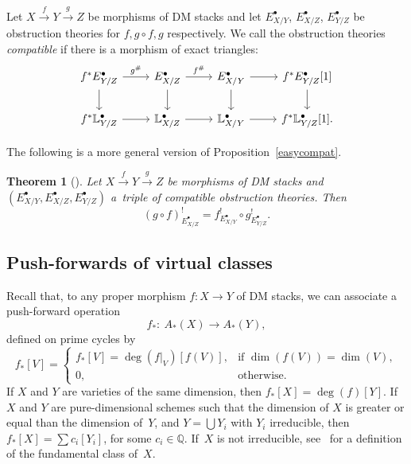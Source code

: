 \documentclass[pdftex]{sigma}
\numberwithin{equation}{section}
\newtheorem{Theorem}{Theorem}[section]
\theoremstyle{plain}
\theoremstyle{definition}
\theoremstyle{remark}
\begin{document}
\begin{Definition} Let $X\xrightarrow{f} Y\xrightarrow{g} Z$ be morphisms of DM stacks and let $E^{\bullet}_{X/Y}$, $E^{\bullet}_{X/Z}$, $E^{\bullet}_{Y/Z}$ be obstruction theories for $f,g\circ f, g$ respectively. We call the obstruction theories \emph{compatible} if there is a morphism of exact triangles:
\[\begin{tikzcd}
f^*E^{\bullet}_{Y/Z}\ar[r,"g^{\#}"]\ar[d] & E^{\bullet}_{X/Z}\ar[r,"f^{\#}"]\ar[d] & E^{\bullet}_{X/Y}\ar[r]\ar[d] & f^*E^{\bullet}_{Y/Z}[1]\ar[d] \\
f^*\mathbb L^{\bullet}_{Y/Z}\ar[r] & \mathbb L^{\bullet}_{X/Z}\ar[r] & \mathbb L^{\bullet}_{X/Y}\ar[r] & f^*\mathbb L^{\bullet}_{Y/Z}[1].
\end{tikzcd}
\]
\end{Definition}
The following is a more general version of Proposition~\ref{easycompat}.
\begin{Theorem}[\cite{vir-pull}]
Let $X\xrightarrow{f} Y\xrightarrow{g} Z$ be morphisms of DM stacks and $(E^{\bullet}_{X/Y}, E^{\bullet}_{X/Z},E^{\bullet}_{Y/Z})$ a~triple of compatible obstruction theories. Then
\[(g\circ f)^{!}_{E^{\bullet}_{X/Z}}=f^{!}_{E^{\bullet}_{X/Y}}\circ g^{!}_{E^{\bullet}_{Y/Z}}.\]
\end{Theorem}

\subsection{Push-forwards of virtual classes}
Recall that, to any proper morphism $f\colon X\to Y$ of DM stacks, we can associate a push-forward operation
\[f_*\colon \ A_*(X)\to A_*(Y),\]
defined on prime cycles by
\[f_*[V]=\begin{cases}f_*[V]=\deg(f|_{V})[f(V)], &\text{if $\dim(f(V))=\dim(V)$},\\
0, &\text{otherwise.}
\end{cases}
\]
If $X$ and $Y$ are varieties of the same dimension, then $f_*[X]=\deg(f)[Y]$. If $X$ and $Y$ are pure-dimensional schemes such that the dimension of $X$ is greater or equal than the dimension of~$Y$, and $Y=\bigcup Y_i$ with $Y_i$ irreducible, then $f_*[X]=\sum c_i[Y_i]$, for some $c_i\in\mathbb Q$. If~$X$ is not irreducible, see~\cite[Chapter 1]{Fulton} for a definition of the fundamental class of~$X$.
\end{document}
